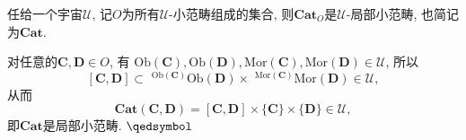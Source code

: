\documentclass[UTF8]{ctexart}
\begin{document}
任给一个宇宙$\mathcal{U}$, 记$O$为所有$\mathcal{U}$-小范畴组成的集合,
则$\mathbf{Cat}_O$是$\mathcal{U}$-局部小范畴, 也简记为$\mathbf{Cat}$.


对任意的$\mathbf{C},\mathbf{D}\in O$, 有
$\mathrm{Ob}(\mathbf{C}),\mathrm{Ob}(\mathbf{D}),
\mathrm{Mor}(\mathbf{C}),\mathrm{Mor}(\mathbf{D})\in\mathcal{U}$, 所以
\[
    [\mathbf{C},\mathbf{D}]\subset
    \,\,\!^{\mathrm{Ob}(\mathbf{C})}\mathrm{Ob}(\mathbf{D})\times
    \,\,\!^{\mathrm{Mor}(\mathbf{C})}\mathrm{Mor}(\mathbf{D})\in\mathcal{U},
\]
从而
\[
    \mathbf{Cat}(\mathbf{C},\mathbf{D})=[\mathbf{C},\mathbf{D}]\times
    \{\mathbf{C}\}\times\{\mathbf{D}\}\in\mathcal{U},
\]
即$\mathbf{Cat}$是局部小范畴. \hfill $\qedsymbol$
\end{document}

